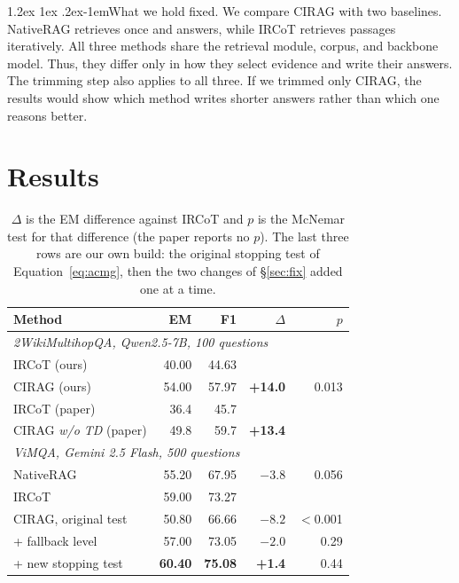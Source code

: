\documentclass[11pt]{article}
\makeatletter
\renewcommand\paragraph{\@startsection{paragraph}{4}{\z@}%
  {1.2ex \@plus1ex \@minus.2ex}{-1em}{\normalfont\normalsize\bfseries}}
\makeatother
\begin{document}
\paragraph{What we hold fixed.} We compare CIRAG with two baselines. NativeRAG retrieves
once and answers, while IRCoT retrieves passages iteratively. All three methods share the
retrieval module, corpus, and backbone model. Thus, they differ only in how they select
evidence and write their answers. The trimming step also applies to all three. If we trimmed
only CIRAG, the results would show which method writes shorter answers rather than which one
reasons better.

\section{Results}
\label{sec:results}

\begin{table}[t]
\centering\footnotesize
\setlength{\tabcolsep}{3pt}
\begin{tabular}{lrrrr}
\toprule
\textbf{Method} & \textbf{EM} & \textbf{F1} & \textbf{$\Delta$} & \textbf{$p$} \\
\midrule
\multicolumn{5}{l}{\emph{2WikiMultihopQA, Qwen2.5-7B, 100 questions}} \\
\quad IRCoT (ours)            & 40.00 & 44.63 & & \\
\quad CIRAG (ours)            & 54.00 & 57.97 & \textbf{+14.0} & 0.013 \\
\quad IRCoT (paper)           & 36.4 & 45.7 & & \\
\quad CIRAG \emph{w/o TD} (paper) & 49.8 & 59.7 & \textbf{+13.4} & \\
\midrule
\multicolumn{5}{l}{\emph{ViMQA, Gemini 2.5 Flash, 500 questions}} \\
\quad NativeRAG & 55.20 & 67.95 & $-3.8$ & 0.056 \\
\quad IRCoT     & 59.00 & 73.27 & & \\
\quad CIRAG, original test & 50.80 & 66.66 & $-8.2$ & $<$0.001 \\
\quad \; + fallback level & 57.00 & 73.05 & $-2.0$ & 0.29 \\
\quad \; + new stopping test & \textbf{60.40} & \textbf{75.08} & \textbf{+1.4} & 0.44 \\
\bottomrule
\end{tabular}
\caption{$\Delta$ is the EM difference against IRCoT and $p$ is the McNemar test for that
difference (the paper reports no $p$). The last three rows are our own build: the original
stopping test of Equation~\ref{eq:acmg}, then the two changes of \S\ref{sec:fix} added one
at a time.}
\label{tab:main}
\end{table}
\end{document}
